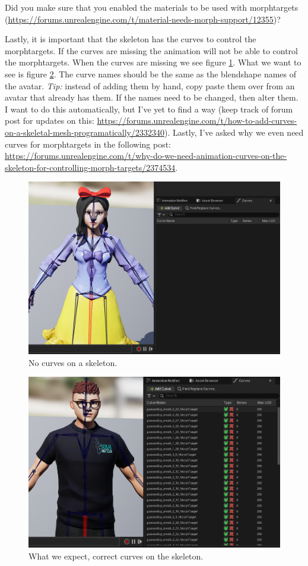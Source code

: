 \documentclass{uva-inf-article}
\begin{document}
Did you make sure that you enabled the materials to be used with morphtargets (\url{https://forums.unrealengine.com/t/material-needs-morph-support/12355})?

Lastly, it is important that the skeleton has the curves to control the morphtargets. If the curves are missing the animation will not be able to control the morphtargets. When the curves are missing we see figure \ref{fig:noCurves}. What we want to see is figure \ref{fig:curves}. The curve names should be the same as the blendshape names of the avatar. \textit{Tip:} instead of adding them by hand, copy paste them over from an avatar that already has them. If the names need to be changed, then alter them. I want to do this automatically, but I've yet to find a way (keep track of forum post for updates on this: \url{https://forums.unrealengine.com/t/how-to-add-curves-on-a-skeletal-mesh-programatically/2332340}). Lastly, I've asked why we even need curves for morphtargets in the following post: \url{https://forums.unrealengine.com/t/why-do-we-need-animation-curves-on-the-skeleton-for-controlling-morph-targets/2374534}.
\begin{figure}[hbt!]
    \centering
    \includegraphics[width=\textwidth]{imgs/nocurves.png}
    \caption{No curves on a skeleton.}
    \label{fig:noCurves}
\end{figure}
\begin{figure}[hbt!]
    \centering
    \includegraphics[width=\textwidth]{imgs/curves.png}
    \caption{What we expect, correct curves on the skeleton.}
    \label{fig:curves}
\end{figure}
\end{document}
